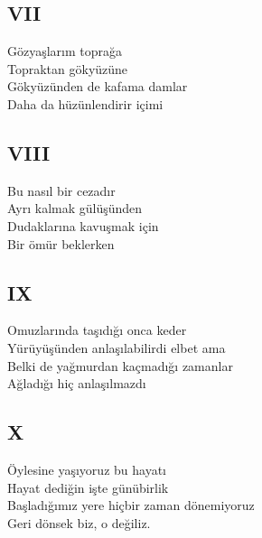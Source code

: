 \subsection{VII}
Gözyaşlarım toprağa \\
Topraktan gökyüzüne \\
Gökyüzünden de kafama damlar \\
Daha da hüzünlendirir içimi

\subsection{VIII}
Bu nasıl bir cezadır \\
Ayrı kalmak gülüşünden \\
Dudaklarına kavuşmak için \\
Bir ömür beklerken

\subsection{IX}
Omuzlarında taşıdığı onca keder \\
Yürüyüşünden anlaşılabilirdi elbet ama \\
Belki de yağmurdan kaçmadığı zamanlar \\
Ağladığı hiç anlaşılmazdı

\subsection{X}
Öylesine yaşıyoruz bu hayatı \\
Hayat dediğin işte günübirlik \\
Başladığımız yere hiçbir zaman dönemiyoruz \\
Geri dönsek biz, o değiliz.